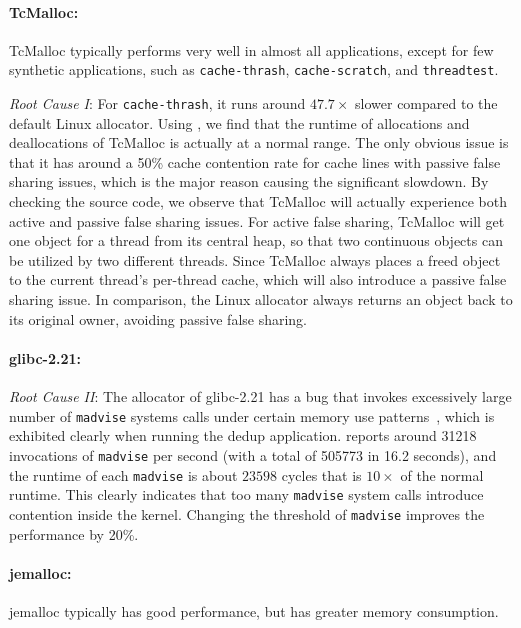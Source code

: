  \paragraph{TcMalloc:}
TcMalloc typically performs very well in almost all applications, except for few synthetic applications, such as \texttt{cache-thrash}, \texttt{cache-scratch}, and \texttt{threadtest}. 

\textit{Root Cause \RN{1}}:
For \texttt{cache-thrash}, it runs around $47.7\times$ slower compared to the default Linux allocator. Using \MP{}, we find that the runtime of allocations and deallocations of TcMalloc is actually at a normal range. The only obvious issue is that it has around a 50\% cache contention rate for cache lines with passive false sharing issues, which is the major reason causing the significant slowdown. By checking the source code, we observe that TcMalloc will actually experience both active and passive false sharing issues. For active false sharing, TcMalloc will get one object for a thread from its central heap, so that two continuous objects can be utilized by two different threads. Since TcMalloc always places a freed object to the current thread's per-thread cache, which will also introduce a passive false sharing issue. In comparison, the Linux allocator always returns an object back to its original owner, avoiding passive false sharing.  

\paragraph{glibc-2.21:}
\textit{Root Cause \RN{2}}: The allocator of glibc-2.21 has a bug that invokes excessively large number of \texttt{madvise} systems calls under certain memory use patterns~\cite{madvise}, which is exhibited clearly when running the dedup application. \MP{} reports around 31218 invocations of \texttt{madvise} per second (with a total of 505773 in 16.2 seconds), and the runtime of each \texttt{madvise} is about $23598$ cycles that is $10\times$ of the normal runtime. This clearly indicates that too many \texttt{madvise} system calls introduce contention inside the kernel. Changing the threshold of \texttt{madvise} improves the performance by 20\%.

\paragraph{jemalloc:} jemalloc typically has good performance, but has greater memory consumption.

